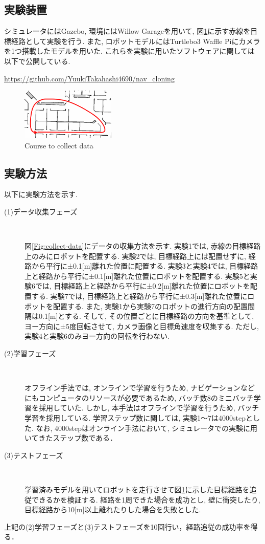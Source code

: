 \documentclass{ujarticle}
\begin{document}
\subsection{実験装置}シミュレータにはGazebo\cite{gazebo}, 環境にはWillow Garage\cite{willow}を用いて, 図\ref{Fig:willow}に示す赤線を目標経路として実験を行う. また, ロボットモデルにはTurtlebo3 Waffle Pi\cite{turtlebot3}にカメラを1つ搭載したモデルを用いた. これらを実験に用いたソフトウェアに関しては以下で公開している. \par \url{https://github.com/YuukiTakahashi4690/nav_cloning}

\begin{figure}[h]
		\centering
		\includegraphics[width=0.4\textwidth]{img/willow-path.png}
		\caption{Course to collect data}
		\label{Fig:willow}
\end{figure}

\subsection{実験方法}
以下に実験方法を示す. 
\begin{description}
		\item[(1)データ収集フェーズ]　
		
		図\ref{Fig:collect-data}にデータの収集方法を示す. 実験1では, 赤線の目標経路上のみにロボットを配置する. 実験2では, 目標経路上には配置せずに, 経路から平行に±0.1[m]離れた位置に配置する. 実験3と実験4では, 目標経路上と経路から平行に±0.1[m]離れた位置にロボットを配置する. 実験5と実験6では, 目標経路上と経路から平行に±0.2[m]離れた位置にロボットを配置する. 実験7では, 目標経路上と経路から平行に±0.3[m]離れた位置にロボットを配置する. また, 実験1から実験7のロボットの進行方向の配置間隔は0.1[m]とする. そして, その位置ごとに目標経路の方向を基準として, ヨー方向に±5度回転させて, カメラ画像と目標角速度を収集する. ただし, 実験4と実験6のみヨー方向の回転を行わない. 
		\item[(2)学習フェーズ]　
		
		オフライン手法では, オンラインで学習を行うため, ナビゲーションなどにもコンピュータのリソースが必要であるため, バッチ数8のミニバッチ学習を採用していた. しかし, 本手法はオフラインで学習を行うため, バッチ学習を採用している. 学習ステップ数に関しては, 実験1～7は4000stepとした. なお, 4000stepはオンライン手法において, シミュレータでの実験に用いてきたステップ数である． 
		\item[(3)テストフェーズ]　
		
		学習済みモデルを用いてロボットを走行させて図\ref{Fig:willow}に示した目標経路を追従できるかを検証する. 経路を1周できた場合を成功とし, 壁に衝突したり, 目標経路から10[m]以上離れたりした場合を失敗とした.
\end{description}
上記の(2)学習フェーズと(3)テストフェーズを10回行い，経路追従の成功率を得る．
\end{document}
